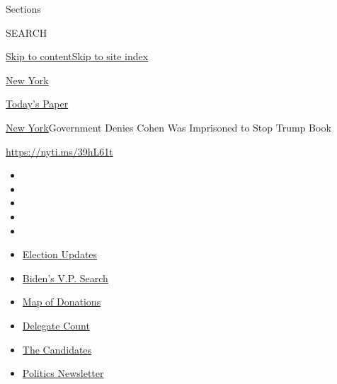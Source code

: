 Sections

SEARCH

\protect\hyperlink{site-content}{Skip to
content}\protect\hyperlink{site-index}{Skip to site index}

\href{https://www.nytimes.com/section/nyregion}{New York}

\href{https://myaccount.nytimes.com/auth/login?response_type=cookie\&client_id=vi}{}

\href{https://www.nytimes.com/section/todayspaper}{Today's Paper}

\href{/section/nyregion}{New York}\textbar{}Government Denies Cohen Was
Imprisoned to Stop Trump Book

\url{https://nyti.ms/39hL61t}

\begin{itemize}
\item
\item
\item
\item
\item
\end{itemize}

\begin{itemize}
\item
  \href{https://www.nytimes.com/2020/08/03/us/elections/biden-vs-trump.html?action=click\&pgtype=Article\&state=default\&region=TOP_BANNER\&context=storylines_menu}{Election
  Updates}
\item
  \href{https://www.nytimes.com/article/biden-vice-president-2020.html?action=click\&pgtype=Article\&state=default\&region=TOP_BANNER\&context=storylines_menu}{Biden's
  V.P. Search}
\item
  \href{https://www.nytimes.com/interactive/2020/07/24/us/politics/trump-biden-campaign-donors.html?action=click\&pgtype=Article\&state=default\&region=TOP_BANNER\&context=storylines_menu}{Map
  of Donations}
\item
  \href{https://www.nytimes.com/interactive/2020/us/elections/delegate-count-primary-results.html?action=click\&pgtype=Article\&state=default\&region=TOP_BANNER\&context=storylines_menu}{Delegate
  Count}
\item
  \href{https://www.nytimes.com/interactive/2019/us/politics/2020-presidential-candidates.html?action=click\&pgtype=Article\&state=default\&region=TOP_BANNER\&context=storylines_menu}{The
  Candidates}
\item
  \href{https://www.nytimes.com/newsletters/politics?action=click\&pgtype=Article\&state=default\&region=TOP_BANNER\&context=storylines_menu}{Politics
  Newsletter}
\end{itemize}

